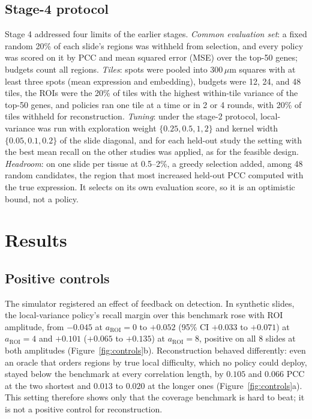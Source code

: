 \documentclass[10pt]{article}
\begin{document}
\subsection{Stage-4 protocol}
\label{sec:s4methods}
Stage 4 addressed four limits of the earlier stages. \emph{Common evaluation set}: a fixed random 20\% of each
slide's regions was withheld from selection, and every policy was scored on it by PCC and mean squared error (MSE)
over the top-50 genes; budgets count all regions. \emph{Tiles}: spots were pooled into 300\,$\mu$m squares with at
least three spots (mean expression and embedding), budgets were 12, 24, and 48 tiles, the ROIs were the 20\% of
tiles with the highest within-tile variance of the top-50 genes, and policies ran one tile at a time or in 2 or 4
rounds, with 20\% of tiles withheld for reconstruction. \emph{Tuning}: under the stage-2 protocol, local-variance
was run with exploration weight $\{0.25, 0.5, 1, 2\}$ and kernel width $\{0.05, 0.1, 0.2\}$ of the slide diagonal,
and for each held-out study the setting with the best mean recall on the other studies was applied, as for the
feasible design. \emph{Headroom}: on one slide per tissue at 0.5--2\%, a greedy selection added, among 48 random
candidates, the region that most increased held-out PCC computed with the true expression. It selects on its own
evaluation score, so it is an optimistic bound, not a policy.

\section{Results}

\subsection{Positive controls}
The simulator registered an effect of feedback on detection. In synthetic slides, the local-variance policy's recall
margin over this benchmark rose with ROI amplitude, from $-0.045$ at $a_{\mathrm{ROI}}=0$ to $+0.052$ (95\% CI
$+0.033$ to $+0.071$) at $a_{\mathrm{ROI}}=4$ and $+0.101$ ($+0.065$ to $+0.135$) at $a_{\mathrm{ROI}}=8$, positive
on all 8 slides at both amplitudes (Figure~\ref{fig:controls}b). Reconstruction behaved differently: even an oracle
that orders regions by true local difficulty, which no policy could deploy, stayed below the benchmark at every
correlation length, by $0.105$ and $0.066$ PCC at the two
shortest and $0.013$ to $0.020$ at the longer ones (Figure~\ref{fig:controls}a). This setting therefore shows only
that the coverage benchmark is hard to beat; it is not a positive control for reconstruction.
\end{document}
